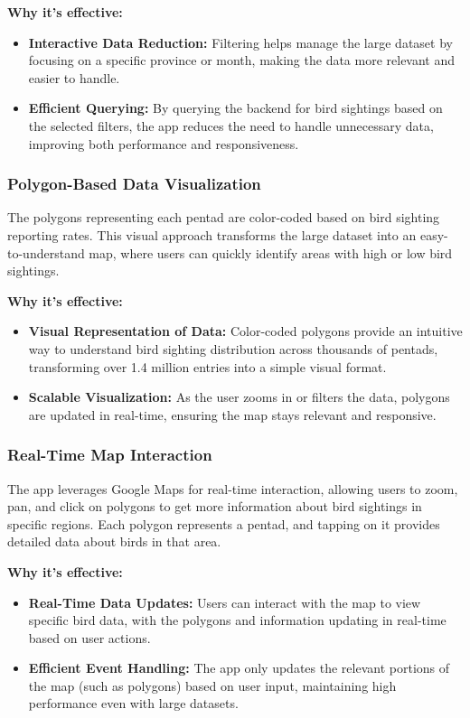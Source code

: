 \documentclass{article}
\begin{document}
\textbf{Why it's effective:}
\begin{itemize}
    \item \textbf{Interactive Data Reduction:} Filtering helps manage the large dataset by focusing on a specific province or month, making the data more relevant and easier to handle.
    \item \textbf{Efficient Querying:} By querying the backend for bird sightings based on the selected filters, the app reduces the need to handle unnecessary data, improving both performance and responsiveness.
\end{itemize}

\subsubsection{Polygon-Based Data Visualization}
The polygons representing each pentad are color-coded based on bird sighting reporting rates. This visual approach transforms the large dataset into an easy-to-understand map, where users can quickly identify areas with high or low bird sightings.

\textbf{Why it's effective:}
\begin{itemize}
    \item \textbf{Visual Representation of Data:} Color-coded polygons provide an intuitive way to understand bird sighting distribution across thousands of pentads, transforming over 1.4 million entries into a simple visual format.
    \item \textbf{Scalable Visualization:} As the user zooms in or filters the data, polygons are updated in real-time, ensuring the map stays relevant and responsive.
\end{itemize}

\subsubsection{Real-Time Map Interaction}
The app leverages Google Maps for real-time interaction, allowing users to zoom, pan, and click on polygons to get more information about bird sightings in specific regions. Each polygon represents a pentad, and tapping on it provides detailed data about birds in that area.

\textbf{Why it's effective:}
\begin{itemize}
    \item \textbf{Real-Time Data Updates:} Users can interact with the map to view specific bird data, with the polygons and information updating in real-time based on user actions.
    \item \textbf{Efficient Event Handling:} The app only updates the relevant portions of the map (such as polygons) based on user input, maintaining high performance even with large datasets.
\end{itemize}
\end{document}
